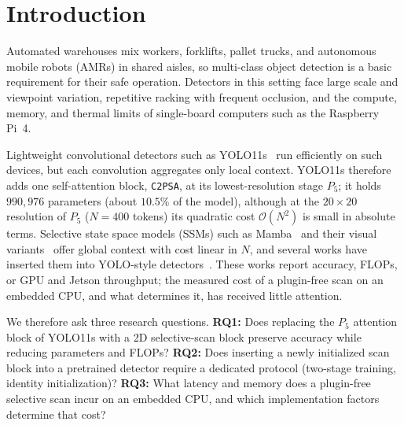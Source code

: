 \section{Introduction}
\label{sec:introduction}
Automated warehouses mix workers, forklifts, pallet trucks, and autonomous mobile robots (AMRs) in shared aisles, so multi-class object detection is a basic requirement for their safe operation. Detectors in this setting face large scale and viewpoint variation, repetitive racking with frequent occlusion, and the compute, memory, and thermal limits of single-board computers such as the Raspberry Pi~4.

Lightweight convolutional detectors such as YOLO11s~\cite{ultralytics2024yolo11} run efficiently on such devices, but each convolution aggregates only local context. YOLO11s therefore adds one self-attention block, \texttt{C2PSA}, at its lowest-resolution stage $P_5$; it holds $990{,}976$ parameters (about $10.5\%$ of the model), although at the $20 \times 20$ resolution of $P_5$ ($N = 400$ tokens) its quadratic cost $\mathcal{O}(N^2)$ is small in absolute terms. Selective state space models (SSMs) such as Mamba~\cite{gu2023mamba} and their visual variants~\cite{liu2024vmamba,zhu2024visionmamba} offer global context with cost linear in $N$, and several works have inserted them into YOLO-style detectors~\cite{wang2025mambayolo,lei2025mambanext,chan2026mambapsa}. These works report accuracy, FLOPs, or GPU and Jetson throughput; the measured cost of a plugin-free scan on an embedded CPU, and what determines it, has received little attention.

We therefore ask three research questions. \textbf{RQ1:} Does replacing the $P_5$ attention block of YOLO11s with a 2D selective-scan block preserve accuracy while reducing parameters and FLOPs? \textbf{RQ2:} Does inserting a newly initialized scan block into a pretrained detector require a dedicated protocol (two-stage training, identity initialization)? \textbf{RQ3:} What latency and memory does a plugin-free selective scan incur on an embedded CPU, and which implementation factors determine that cost?


